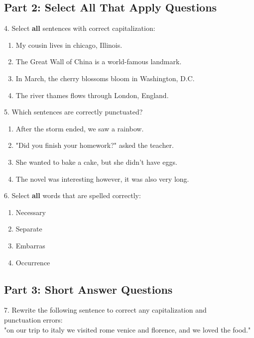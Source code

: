 \documentclass[12pt]{article}
\begin{document}
\vspace{1cm}

\subsection*{Part 2: Select All That Apply Questions}

4. Select \textbf{all} sentences with correct capitalization:  
\begin{enumerate}[label=\Alph*.]
    \item My cousin lives in chicago, Illinois.  
    \item The Great Wall of China is a world-famous landmark.  
    \item In March, the cherry blossoms bloom in Washington, D.C.  
    \item The river thames flows through London, England.  
\end{enumerate}

\vspace{1cm}

5. Which sentences are correctly punctuated?  
\begin{enumerate}[label=\Alph*.]
    \item After the storm ended, we saw a rainbow.  
    \item "Did you finish your homework?" asked the teacher.  
    \item She wanted to bake a cake, but she didn't have eggs.  
    \item The novel was interesting however, it was also very long.  
\end{enumerate}

\vspace{1cm}

6. Select \textbf{all} words that are spelled correctly:  
\begin{enumerate}[label=\Alph*.]
    \item Necessary  
    \item Separate  
    \item Embarras  
    \item Occurrence  
\end{enumerate}

\vspace{1cm}
\newpage
\subsection*{Part 3: Short Answer Questions}

7. Rewrite the following sentence to correct any capitalization and\\
 punctuation errors: \\  
"on our trip to italy we visited rome venice and florence, and we loved the food."  
\vspace{4cm}
\end{document}
